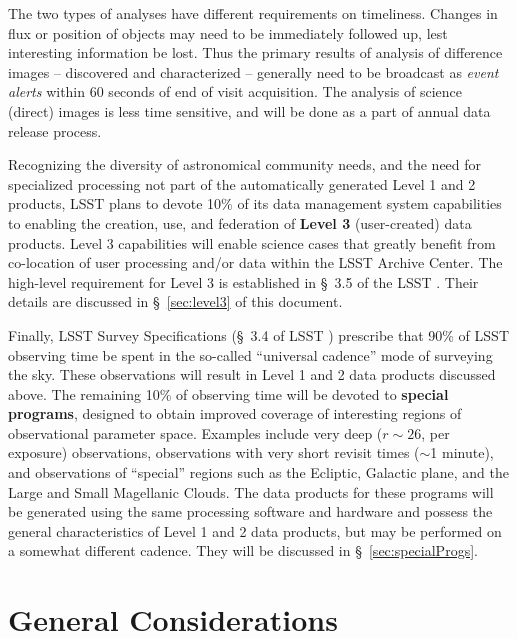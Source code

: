 \documentclass[SE,lsstdraft,toc]{lsstdoc}
\newcommand{\marginreq}[1]{\marginpar{\hspace{0pt}\tiny #1}}
\newcommand{\dmreq}[1]{\marginreq{DMS-REQ-#1}}
\newcommand{\reqparam}[1]{\marginreq{#1}}
\begin{document}
The two types of analyses have different requirements on timeliness. Changes in flux or position of objects may need to be immediately followed up, lest interesting information be lost. Thus the primary results of analysis of difference images -- discovered and characterized \DIASources{} -- generally need to be broadcast as \emph{event alerts} within 60 seconds\reqparam{OTT1} of end of visit acquisition.\dmreq{0004} The analysis of science (direct) images is less time sensitive, and will be done as a part of annual data release process.

\vspace{1em}

Recognizing the diversity of astronomical community needs, and the need for specialized processing not part of the automatically generated Level 1 and 2 products, LSST plans to devote 10\% of its data management system capabilities to enabling the creation, use, and federation of \textbf{Level 3} (user-created) data products. Level 3 capabilities will enable science cases that greatly benefit from co-location of user processing and/or data within the LSST Archive Center. The high-level requirement for Level 3 is established in \S~3.5 of the LSST \SRD. Their details are discussed in \S~\ref{sec:level3} of this document.

\vspace{1em}

Finally, LSST Survey Specifications (\S~3.4 of LSST \SRD) prescribe that 90\% of LSST observing time be spent in the so-called ``universal cadence'' mode of surveying the sky. These observations will result in Level 1 and 2 data products discussed above. The remaining 10\% of observing time will be devoted to \textbf{special programs}, designed to obtain improved coverage of interesting regions of observational parameter space. Examples include very deep ($r \sim 26$, per exposure) observations, observations with very short revisit times ($\sim$1 minute), and observations of ``special'' regions such as the Ecliptic, Galactic plane, and the Large and Small Magellanic Clouds. The data products for these programs will be generated using the same processing software and hardware and possess the general characteristics of Level 1 and 2 data products, but may be performed on a somewhat different cadence. They will be discussed in \S~\ref{sec:specialProgs}.


\section{General Considerations}
\end{document}
